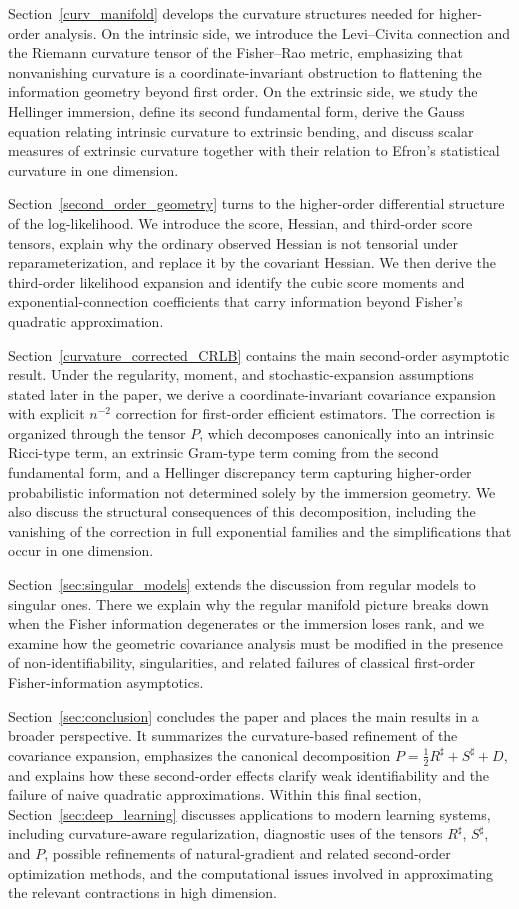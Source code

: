 \documentclass[11pt,letterpaper]{amsart}
\numberwithin{equation}{section}
\theoremstyle{plain}
\theoremstyle{definition}
\theoremstyle{remark}
\begin{document}
Section~\ref{curv_manifold} develops the curvature structures needed for higher-order analysis. On the intrinsic side, we introduce the Levi--Civita connection and the Riemann curvature tensor of the Fisher--Rao metric, emphasizing that nonvanishing curvature is a coordinate-invariant obstruction to flattening the information geometry beyond first order. On the extrinsic side, we study the Hellinger immersion, define its second fundamental form, derive the Gauss equation relating intrinsic curvature to extrinsic bending, and discuss scalar measures of extrinsic curvature together with their relation to Efron's statistical curvature in one dimension.

Section~\ref{second_order_geometry} turns to the higher-order differential structure of the log-likelihood. We introduce the score, Hessian, and third-order score tensors, explain why the ordinary observed Hessian is not tensorial under reparameterization, and replace it by the covariant Hessian. We then derive the third-order likelihood expansion and identify the cubic score moments and exponential-connection coefficients that carry information beyond Fisher's quadratic approximation.

Section~\ref{curvature_corrected_CRLB} contains the main second-order asymptotic result. Under the regularity, moment, and stochastic-expansion assumptions stated later in the paper, we derive a coordinate-invariant covariance expansion with explicit \(n^{-2}\) correction for first-order efficient estimators. The correction is organized through the tensor \(P\), which decomposes canonically into an intrinsic Ricci-type term, an extrinsic Gram-type term coming from the second fundamental form, and a Hellinger discrepancy term capturing higher-order probabilistic information not determined solely by the immersion geometry. We also discuss the structural consequences of this decomposition, including the vanishing of the correction in full exponential families and the simplifications that occur in one dimension.

Section~\ref{sec:singular_models} extends the discussion from regular models to singular ones. There we explain why the regular manifold picture breaks down when the Fisher information degenerates or the immersion loses rank, and we examine how the geometric covariance analysis must be modified in the presence of non-identifiability, singularities, and related failures of classical first-order Fisher-information asymptotics.

Section~\ref{sec:conclusion} concludes the paper and places the main results in a broader perspective. It summarizes the curvature-based refinement of the covariance expansion, emphasizes the canonical decomposition \(P=\frac12 R^\sharp+S^\sharp+D\), and explains how these second-order effects clarify weak identifiability and the failure of naive quadratic approximations. Within this final section, Section~\ref{sec:deep_learning} discusses applications to modern learning systems, including curvature-aware regularization, diagnostic uses of the tensors \(R^\sharp\), \(S^\sharp\), and \(P\), possible refinements of natural-gradient and related second-order optimization methods, and the computational issues involved in approximating the relevant contractions in high dimension.
\end{document}

